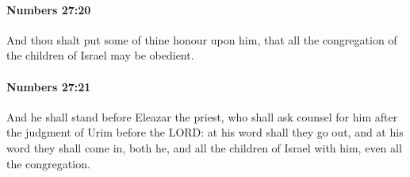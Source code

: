 		\paragraph{Numbers 27:20} %
			\label{NUMBERS-27-20}

			And thou shalt put some of thine honour upon him, that all the congregation of the children of Israel may be obedient.


		\paragraph{Numbers 27:21} %
			\label{NUMBERS-27-21}

			And he shall stand before Eleazar the priest, who shall ask counsel for him after the judgment of Urim before the LORD: at his word shall they go out, and at his word they shall come in, both he, and all the children of Israel with him, even all the congregation.

